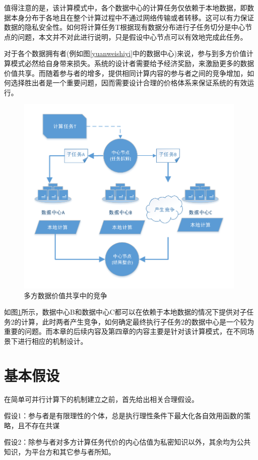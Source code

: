 \documentclass[promaster]{thesis-uestc}
\begin{document}
值得注意的是，该计算模式中，各个数据中心的计算任务仅依赖于本地数据，即数据本身分布于各地且在整个计算过程中不通过网络传输或者转移。这可以有力保证数据的隐私安全性。如何将计算任务T根据现有数据分布进行子任务切分是中心节点的问题，本文并不对此进行说明，只是假设中心节点可以有效地完成此任务。

对于各个数据拥有者(例如图\ref{yuanweishiyi}中的数据中心)来说，参与到多方价值计算模式必然给自身带来损失。系统的设计者需要给予经济奖励，来激励更多的数据价值共享。而随着参与者的增多，提供相同计算内容的参与者之间的竞争增加，如何选择胜出者是一个重要问题，因而需要设计合理的价格体系来保证系统的有效运行。
\begin{figure}[h]
\includegraphics[width=350pt]{pic/yuanweijili.pdf}
\caption{多方数据价值共享中的竞争}
\label{yuanweijili}
\end{figure}
如图\ref{yuanweijili}所示，数据中心B和数据中心C都可以在依赖于本地数据的情况下提供对子任务2的计算，此时两者产生竞争，如何确定最终执行子任务2的数据中心是一个较为重要的问题。而本章的后续内容及第四章的内容主要是针对该计算模式，在不同场景下进行相应的机制设计。

\section{基本假设}
在简单可并行计算下的机制建立之前，首先给出相关合理假设。

假设1：参与者是有限理性的个体，总是执行理性条件下最大化各自效用函数的策略，且不存在共谋

假设2：除参与者对多方计算任务代价的内心估值为私密知识以外，其余均为公共知识，为平台方和其它参与者所知。
\end{document}
